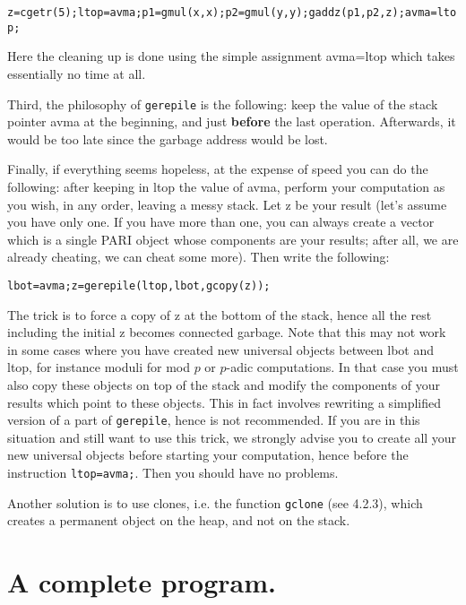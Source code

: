 {\tt z=cgetr(5);ltop=avma;p1=gmul(x,x);p2=gmul(y,y);gaddz(p1,p2,z);avma=ltop;}

Here the cleaning up is done using the simple assignment avma=ltop which
takes essentially no time at all.

Third, the philosophy of {\tt gerepile} is the following: keep the value of the
stack pointer avma at the beginning, and just {\bf before} the last operation.
Afterwards, it would be too late since the garbage address would be lost.

Finally, if everything seems hopeless, at the expense of speed you can do the
following: after keeping in ltop the value of avma, perform your computation
as you wish, in any order, leaving a messy stack. Let z be your result
(let's assume you have only one. If you have more than one, you can always create a
vector which is a single PARI object whose components are your results;
after all, we are already cheating, we can cheat some more). Then write the following:

{\tt lbot=avma;z=gerepile(ltop,lbot,gcopy(z));}

The trick is to force a copy of z at the bottom of the stack, hence all the
rest including the initial z becomes connected garbage. Note that this
may not work in some cases where you have created new universal objects between
lbot and ltop, for instance moduli for mod $p$ or $p$-adic computations.
In that case you must also copy these objects on top of the
stack and modify the components of your results which point to these objects.
This in fact involves rewriting a simplified version of a part of {\tt gerepile}, hence
is not recommended. If you are in this situation and still want to use this trick,
we strongly advise you to create all your new universal objects before starting
your computation, hence before the instruction {\tt ltop=avma;}. Then you should
have no problems.

Another solution is to use clones, i.e. the function {\tt gclone} (see 4.2.3),
which creates a permanent object on the heap, and not on the stack.

\section{A complete program.}

